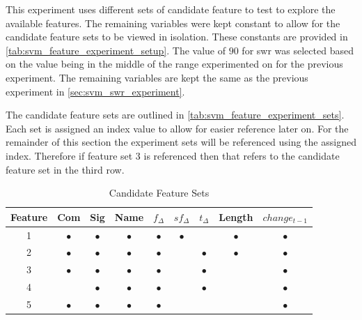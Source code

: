 

This experiment uses different sets of candidate feature to test to explore the available features. The remaining variables were kept constant to allow for the candidate feature sets to be viewed in isolation. These constants are provided in \autoref{tab:svm_feature_experiment_setup}. The value of $90$ for \gls{swr} was selected based on the value being in the middle of the range experimented on for the previous experiment. The remaining variables are kept the same as the previous experiment in \autoref{sec:svm_swr_experiment}. 

The candidate feature sets are outlined in \autoref{tab:svm_feature_experiment_sets}. Each set is assigned an index value to allow for easier reference later on. For the remainder of this section the experiment sets will be referenced using the assigned index. Therefore if feature set 3 is referenced then that refers to the candidate feature set in the third row.

\begin{table}[h]
\begin{center}

    \begin{tabular}{|c|c|c|c|c|c|c|c|c|}
        \hline
        Feature & Com & Sig & Name & $f_{\Delta}$ & $sf_{\Delta}$ & $t_\Delta$ & Length & $change_{t-1}$ \\
         \hline
        1 & $\bullet$ & $\bullet$ & $\bullet$ & $\bullet$ & $\bullet$ & & $\bullet$ & $\bullet$ \\
        2 & $\bullet$ & $\bullet$ & $\bullet$ & $\bullet$ & & $\bullet$ & $\bullet$ & $\bullet$ \\
        3 & $\bullet$ & $\bullet$ & $\bullet$ & $\bullet$ & & $\bullet$ & & $\bullet$ \\
        4 & & $\bullet$ & $\bullet$ & $\bullet$ & & $\bullet$ & & $\bullet$ \\
        5 & $\bullet$ & $\bullet$ & $\bullet$ & $\bullet$ & & & & $\bullet$ \\ \hline
    \end{tabular}
    \caption{Candidate Feature Sets}
    \label{tab:svm_feature_experiment_sets}
\end{center}

\end{table}

